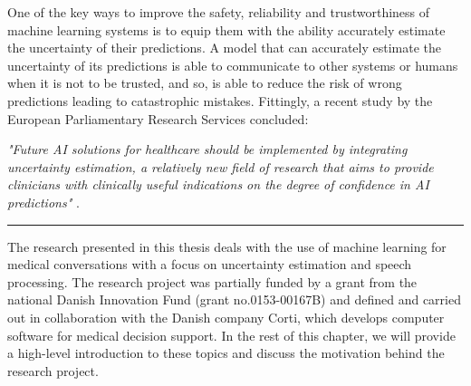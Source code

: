 One of the key ways to improve the safety, reliability and trustworthiness of machine learning systems is to equip them with the ability accurately estimate the uncertainty of their predictions. 
A model that can accurately estimate the uncertainty of its predictions is able to communicate to other systems or humans when it is not to be trusted, and so, is able to reduce the risk of wrong predictions leading to catastrophic mistakes. 
Fittingly, a recent study by the European Parliamentary Research Services concluded: 

\begin{center}

\textit{"Future AI solutions for healthcare should be implemented by integrating uncertainty estimation, a relatively new field of research that aims to provide clinicians with clinically useful indications on the degree of confidence in AI predictions"} \cite{europeanparliament_artificial_2022}. 

\end{center}


\vspace{0.5em}
\begin{center}
\noindent\rule{0.2\textwidth}{0.5pt}
\end{center}
\vspace{1em}

\noindent The research presented in this thesis deals with the use of machine learning for medical conversations with a focus on uncertainty estimation and speech processing. 
The research project was partially funded by a grant from the national Danish Innovation Fund (grant no.\@ 0153-00167B) and defined and carried out in collaboration with the Danish company Corti, which develops computer software for medical decision support. 
In the rest of this chapter, we will provide a high-level introduction to these topics and discuss the motivation behind the research project.



